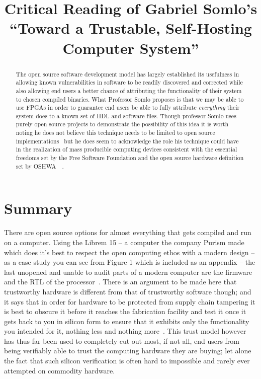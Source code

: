 \documentclass[conference]{IEEEtran}
\begin{document}
\title{Critical Reading of Gabriel Somlo's ``Toward a Trustable, Self-Hosting Computer System''}

\author{}

\maketitle

\begin{abstract}
The open source software development model has largely established its usefulness in allowing known vulnerabilities in software to be readily discovered and corrected while also allowing end users a better chance of attributing the functionality of their system to chosen compiled binaries. What Professor Somlo proposes is that we may be able to use FPGAs in order to guarantee end users be able to fully attribute \textit{{everything}} their system does to a known set of HDL and software files. Though professor Somlo uses purely open source projects to demonstrate the possibility of this idea it is worth noting he does not believe this technique needs to be limited to open source implementations~\cite{Somlo} but he does seem to acknowledge the role his technique could have in the realization of mass producible computing devices consistent with the essential freedoms set by the Free Software Foundation and the open source hardware definition set by OSHWA~\cite{fsf}~\cite{oshwa}.
\end{abstract}

\section{Summary}
There are open source options for almost everything that gets compiled and run on a computer. Using the Librem 15 – a computer the company Purism made which does it’s best to respect the open computing ethos with a modern design – as a case study you can see from Figure 1 which is included as an appendix – the last unopened and unable to audit parts of a modern computer are the firmware and the RTL of the processor~\cite{bunnie}. There is an argument to be made here that trustworthy hardware is different from that of trustworthy software though; and it says that in order for hardware to be protected from supply chain tampering it is best to obscure it before it reaches the fabrication facility and test it once it gets back to you in silicon form to ensure that it exhibits only the functionality you intended for it, nothing less and nothing more~\cite{karri}. This trust model however has thus far been used to completely cut out most, if not all, end users from being verifiably able to trust the computing hardware they are buying; let alone the fact that such silicon verification is often hard to impossible and rarely ever attempted on commodity hardware.
\end{document}
